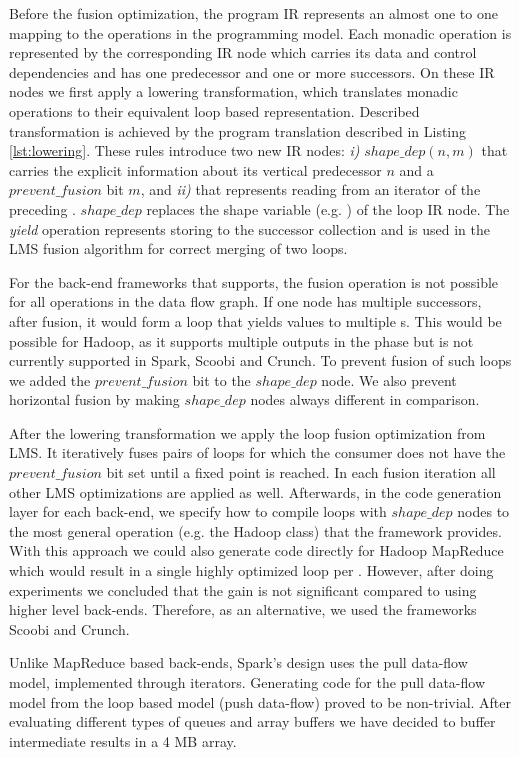 Before the fusion optimization, the program IR represents an almost one to one
mapping to the operations in the programming model. Each monadic operation is
represented by the corresponding IR node which carries its data and control
dependencies and has one predecessor and one or more successors. On these IR
nodes we first apply a lowering transformation, which translates monadic
operations to their equivalent loop based representation. Described
transformation is achieved by the program translation described in Listing
\ref{lst:lowering}. These rules introduce two new IR nodes: \emph{i)}
$shape\_dep(n, m)$ that carries the explicit information about its vertical
predecessor $n$ and a $prevent\_fusion$ bit $m$, and \emph{ii)}
 that represents reading from an iterator of the
preceding . $shape\_dep$ replaces the shape variable (e.g.
) of the loop IR node. The \emph{yield} operation represents
storing to the successor collection and is used in the LMS fusion algorithm for
correct merging of two loops.

For the back-end frameworks that \tool supports, the fusion operation is not
possible for all operations in the data flow graph. If one node has multiple
successors, after fusion, it would form a loop that yields values to multiple
s. This would be possible for Hadoop, as it supports multiple
outputs in the  phase but is not currently supported in Spark, Scoobi
and Crunch. To prevent fusion of such loops we added the $prevent\_fusion$ bit
to the $shape\_dep$ node. We also prevent horizontal fusion by making
$shape\_dep$ nodes always different in comparison.

After the lowering transformation we apply the loop fusion optimization from
LMS. It iteratively fuses pairs of loops for which the consumer does not have
the $prevent\_fusion$ bit set until a fixed point is reached. In each fusion
iteration all other LMS optimizations are applied as well. Afterwards, in the
code generation layer for each back-end, we specify how to compile loops with
$shape\_dep$ nodes to the most general operation (e.g. the Hadoop 
class) that the framework provides. With this approach we could also generate
code directly for Hadoop MapReduce which would result in a single highly
optimized loop per . However, after doing experiments we concluded
that the gain is not significant compared to using higher level back-ends.
Therefore, as an alternative, we used the frameworks Scoobi and Crunch.


Unlike MapReduce based back-ends, Spark's design uses the pull data-flow model,
implemented through iterators. Generating code for the pull data-flow model from
the loop based model (push data-flow) proved to be non-trivial. After evaluating
different types of queues and array buffers we have decided to buffer
intermediate results in a 4 MB array.
